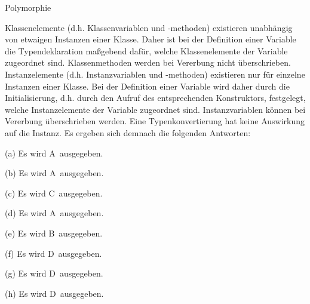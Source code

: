 \begin{exercise}{Polymorphie}
\begin{solution}
Klassenelemente (d.h. Klassenvariablen und -methoden) existieren unabhängig von etwaigen Instanzen einer Klasse. Daher ist bei der Definition einer Variable die Typendeklaration maßgebend dafür, welche Klassenelemente der Variable zugeordnet sind. Klassenmethoden werden bei Vererbung nicht überschrieben. Instanzelemente (d.h. Instanzvariablen und -methoden) existieren nur für einzelne Instanzen einer Klasse. Bei der Definition einer Variable wird daher durch die Initialisierung, d.h. durch den Aufruf des entsprechenden Konstruktors, festgelegt, welche Instanzelemente der Variable zugeordnet sind. Instanzvariablen können bei Vererbung überschrieben werden. Eine Typenkonvertierung hat keine Auswirkung auf die Instanz. Es ergeben sich demnach die folgenden Antworten:
\begin{center}
\begin{minipage}{0.45\textwidth}
\begin{parts}
\item[(a)]
Es wird \glqq A\grqq\ ausgegeben. 

\item[(b)]
Es wird \glqq A\grqq\ ausgegeben. 

\item[(c)]
Es wird \glqq C\grqq\ ausgegeben. 

\item[(d)]
Es wird \glqq A\grqq\ ausgegeben. 
\end{parts}
\end{minipage}
\begin{minipage}{0.45\textwidth}
\begin{parts}
\item[(e)]
Es wird \glqq B\grqq\ ausgegeben. 

\item[(f)]
Es wird \glqq D\grqq\ ausgegeben. 

\item[(g)]
Es wird \glqq D\grqq\ ausgegeben. 

\item[(h)]
Es wird \glqq D\grqq\ ausgegeben. 
\end{parts}
\end{minipage}
\end{center}
\end{solution}
\end{exercise}


